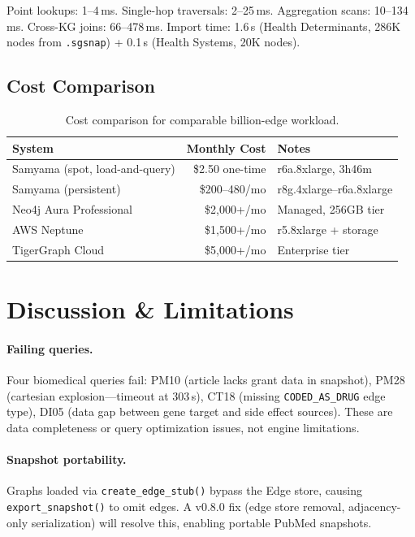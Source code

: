 \documentclass[11pt]{article}
\begin{document}
Point lookups: 1--4\,ms. Single-hop traversals: 2--25\,ms. Aggregation scans: 10--134\,ms. Cross-KG joins: 66--478\,ms. Import time: 1.6\,s (Health Determinants, 286K nodes from \texttt{.sgsnap}) + 0.1\,s (Health Systems, 20K nodes).

\subsection{Cost Comparison}

\begin{table}[H]
  \centering
  \caption{Cost comparison for comparable billion-edge workload.}
  \label{tab:cost}
  \begin{tabular}{@{}lrl@{}}
    \toprule
    \textbf{System} & \textbf{Monthly Cost} & \textbf{Notes} \\
    \midrule
    Samyama (spot, load-and-query) & \$2.50 one-time & r6a.8xlarge, 3h46m \\
    Samyama (persistent)           & \$200--480/mo    & r8g.4xlarge--r6a.8xlarge \\
    Neo4j Aura Professional        & \$2,000+/mo      & Managed, 256GB tier \\
    AWS Neptune                    & \$1,500+/mo      & r5.8xlarge + storage \\
    TigerGraph Cloud               & \$5,000+/mo      & Enterprise tier \\
    \bottomrule
  \end{tabular}
\end{table}

\section{Discussion \& Limitations}
\label{sec:discussion}

\paragraph{Failing queries.} Four biomedical queries fail: PM10 (article lacks grant data in snapshot), PM28 (cartesian explosion---timeout at 303\,s), CT18 (missing \texttt{CODED\_AS\_DRUG} edge type), DI05 (data gap between gene target and side effect sources). These are data completeness or query optimization issues, not engine limitations.

\paragraph{Snapshot portability.} Graphs loaded via \texttt{create\_edge\_stub()} bypass the Edge store, causing \texttt{export\_snapshot()} to omit edges. A v0.8.0 fix (edge store removal, adjacency-only serialization) will resolve this, enabling portable PubMed snapshots.
\end{document}
